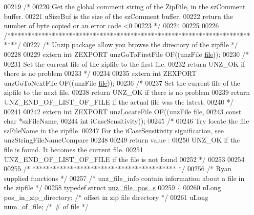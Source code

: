 \begin{DoxyCode}
00219 \textcolor{comment}{/*}
00220 \textcolor{comment}{  Get the global comment string of the ZipFile, in the szComment buffer.}
00221 \textcolor{comment}{  uSizeBuf is the size of the szComment buffer.}
00222 \textcolor{comment}{  return the number of byte copied or an error code <0}
00223 \textcolor{comment}{*/}
00224 
00225 
00226 \textcolor{comment}{/***************************************************************************/}
00227 \textcolor{comment}{/* Unzip package allow you browse the directory of the zipfile */}
00228 
00229 \textcolor{keyword}{extern} \textcolor{keywordtype}{int} ZEXPORT unzGoToFirstFile OF((unzFile \hyperlink{structfile}{file}));
00230 \textcolor{comment}{/*}
00231 \textcolor{comment}{  Set the current file of the zipfile to the first file.}
00232 \textcolor{comment}{  return UNZ\_OK if there is no problem}
00233 \textcolor{comment}{*/}
00234 
00235 \textcolor{keyword}{extern} \textcolor{keywordtype}{int} ZEXPORT unzGoToNextFile OF((unzFile \hyperlink{structfile}{file}));
00236 \textcolor{comment}{/*}
00237 \textcolor{comment}{  Set the current file of the zipfile to the next file.}
00238 \textcolor{comment}{  return UNZ\_OK if there is no problem}
00239 \textcolor{comment}{  return UNZ\_END\_OF\_LIST\_OF\_FILE if the actual file was the latest.}
00240 \textcolor{comment}{*/}
00241 
00242 \textcolor{keyword}{extern} \textcolor{keywordtype}{int} ZEXPORT unzLocateFile OF((unzFile \hyperlink{structfile}{file},
00243                      \textcolor{keyword}{const} \textcolor{keywordtype}{char} *szFileName,
00244                      \textcolor{keywordtype}{int} iCaseSensitivity));
00245 \textcolor{comment}{/*}
00246 \textcolor{comment}{  Try locate the file szFileName in the zipfile.}
00247 \textcolor{comment}{  For the iCaseSensitivity signification, see unzStringFileNameCompare}
00248 \textcolor{comment}{}
00249 \textcolor{comment}{  return value :}
00250 \textcolor{comment}{  UNZ\_OK if the file is found. It becomes the current file.}
00251 \textcolor{comment}{  UNZ\_END\_OF\_LIST\_OF\_FILE if the file is not found}
00252 \textcolor{comment}{*/}
00253 
00254 
00255 \textcolor{comment}{/* ****************************************** */}
00256 \textcolor{comment}{/* Ryan supplied functions */}
00257 \textcolor{comment}{/* unz\_file\_info contain information about a file in the zipfile */}
00258 \textcolor{keyword}{typedef} \textcolor{keyword}{struct }\hyperlink{structunz__file__pos__s}{unz\_file\_pos\_s}
00259 \{
00260     uLong pos\_in\_zip\_directory;   \textcolor{comment}{/* offset in zip file directory */}
00261     uLong num\_of\_file;            \textcolor{comment}{/* # of file */}

\end{DoxyCode}

